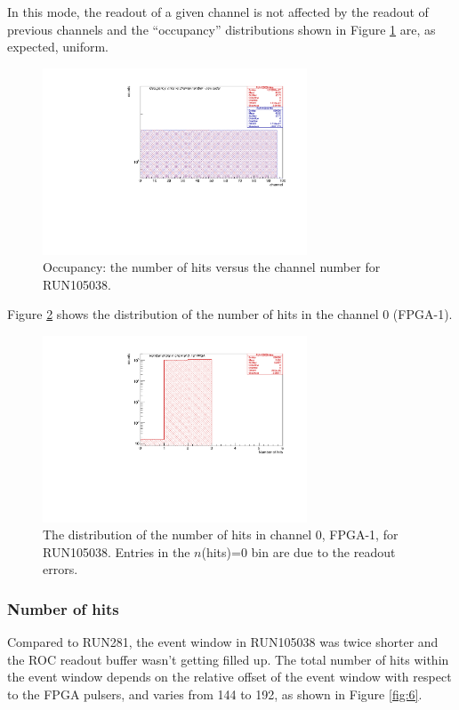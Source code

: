 In this mode, the readout of a given channel is not affected by the readout of previous
channels and the ``occupancy'' distributions shown in Figure \ref{fig:5} are, as expected, uniform.
\begin{figure}[!h]
\centering
\includegraphics[width =0.7\textwidth]{figures/pdf/figure_00002_nhitsvschannel_roc_simulation_2.pdf}
\caption{Occupancy: the number of hits versus the channel number for RUN105038.}
\label{fig:5}
\end{figure}


Figure \ref{fig:67} shows the distribution of the number of hits in the channel 0 (FPGA-1).
\begin{figure}[!h]
\centering
\includegraphics[width =0.7\textwidth]{figures/pdf/figure_00067_nhits_ch00_run105038.pdf}
\caption{
  The distribution of the number of hits in channel 0, FPGA-1, for RUN105038.
  Entries in the $n$(hits)=0 bin are due to the readout errors.
}
\label{fig:67}
\end{figure}

\subsubsection{Number of hits}
Compared to RUN281, the event window in RUN105038 was twice shorter
and the ROC readout buffer wasn't getting filled up.
The total number of hits within the event window depends on the relative offset
of the event window with respect to the FPGA pulsers, and varies from
144 to 192, as shown in Figure \ref{fig:6}.

